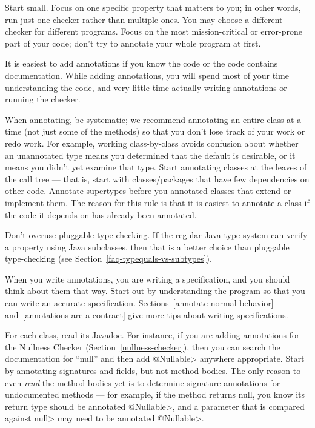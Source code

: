 
Start small.  Focus on one specific property that matters to you; in
other words, run just one checker rather than multiple ones.  You may
choose a different checker for different programs.
Focus on
the most mission-critical or error-prone part of your code; don't try to
annotate your whole program at first.

It is easiest to add annotations if you know the code or the
code contains documentation.  While adding annotations, you will spend most of your time
understanding the code, and very little time actually writing annotations
or running the checker.

When annotating, be systematic; we recommend
annotating an entire class at a time (not just some of the methods)
so that you don't lose track of your work or redo work.  For example,
working class-by-class avoids confusion about whether an unannotated type
means you determined that the default is desirable, or it means you didn't
yet examine that type.
Start annotating classes at the leaves of the call tree ---
that is,
start with classes/packages that have few dependencies on other
code.  Annotate supertypes before you
annotated classes that extend or implement them.
The reason for this rule is that it is
easiest to annotate a class if the code it depends on has already been
annotated.

Don't overuse pluggable type-checking.  If the regular Java type system can
verify a property using Java subclasses, then that is a better choice than
pluggable type-checking (see Section~\ref{faq-typequals-vs-subtypes}).



When you write annotations, you are writing a specification, and you should
think about them that way.  Start out by understanding the program so that
you can write an accurate specification.
Sections~\ref{annotate-normal-behavior}
and~\ref{annotations-are-a-contract} give more tips about writing
specifications.

For each class, read its Javadoc.  For instance, if you are adding
annotations for the Nullness Checker (Section~\ref{nullness-checker}), then
you can search the documentation for ``null'' and then add \<@Nullable>
anywhere appropriate.  Start by annotating signatures and fields, but not
method bodies.  The only reason to even
\emph{read} the method bodies yet is to determine signature annotations for
undocumented methods ---
for example, if the method returns null, you know its return type should be
annotated \<@Nullable>, and a parameter that is compared against \<null>
may need to be annotated \<@Nullable>.

